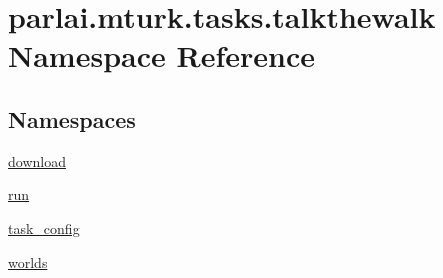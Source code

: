 \hypertarget{namespaceparlai_1_1mturk_1_1tasks_1_1talkthewalk}{}\section{parlai.\+mturk.\+tasks.\+talkthewalk Namespace Reference}
\label{namespaceparlai_1_1mturk_1_1tasks_1_1talkthewalk}
\subsection*{Namespaces}
\begin{DoxyCompactItemize}
\item 
 \hyperlink{namespaceparlai_1_1mturk_1_1tasks_1_1talkthewalk_1_1download}{download}
\item 
 \hyperlink{namespaceparlai_1_1mturk_1_1tasks_1_1talkthewalk_1_1run}{run}
\item 
 \hyperlink{namespaceparlai_1_1mturk_1_1tasks_1_1talkthewalk_1_1task__config}{task\+\_\+config}
\item 
 \hyperlink{namespaceparlai_1_1mturk_1_1tasks_1_1talkthewalk_1_1worlds}{worlds}
\end{DoxyCompactItemize}
